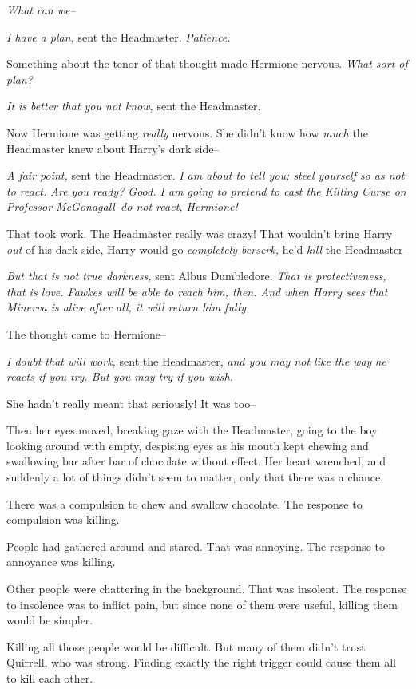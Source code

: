 \emph{What can we\---}

\emph{I have a plan,} sent the Headmaster. \emph{Patience.}

Something about the tenor of that thought made Hermione nervous. \emph{What sort of plan?}

\emph{It is better that you not know,} sent the Headmaster.

Now Hermione was getting \emph{really} nervous. She didn't know how \emph{much} the Headmaster knew about Harry's dark side\---

\emph{A fair point,} sent the Headmaster. \emph{I am about to tell you; steel yourself so as not to react. Are you ready? Good. I am going to pretend to cast the Killing Curse on Professor McGonagall\---\emph{do not react,} Hermione!}

That took work. The Headmaster really was crazy! That wouldn't bring Harry \emph{out} of his dark side, Harry would go \emph{completely berserk,} he'd \emph{kill} the Headmaster\---

\emph{But that is not true darkness,} sent Albus Dumbledore. \emph{That is protectiveness, that is love. Fawkes will be able to reach him, then. And when Harry sees that Minerva is alive after all, it will return him fully.}

The thought came to Hermione\---

\emph{I doubt that will work,} sent the Headmaster, \emph{and you may not like the way he reacts if you try. But you may try if you wish.}

She hadn't really meant that seriously! It was too\---

Then her eyes moved, breaking gaze with the Headmaster, going to the boy looking around with empty, despising eyes as his mouth kept chewing and swallowing bar after bar of chocolate without effect. Her heart wrenched, and suddenly a lot of things didn't seem to matter, only that there was a chance.

\later

There was a compulsion to chew and swallow chocolate. The response to compulsion was killing.

People had gathered around and stared. That was annoying. The response to annoyance was killing.

Other people were chattering in the background. That was insolent. The response to insolence was to inflict pain, but since none of them were useful, killing them would be simpler.

Killing all those people would be difficult. But many of them didn't trust Quirrell, who was strong. Finding exactly the right trigger could cause them all to kill each other.


